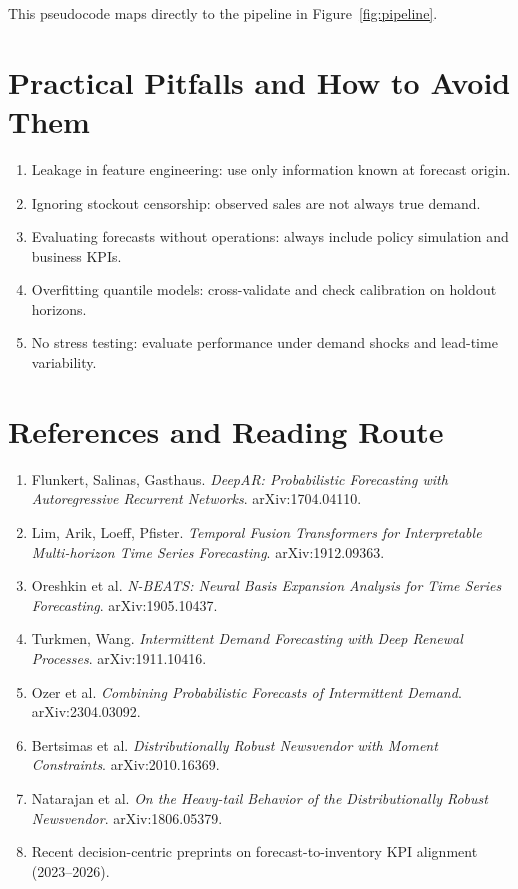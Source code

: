 \documentclass[11pt,a4paper]{article}
\begin{document}
This pseudocode maps directly to the pipeline in Figure~\ref{fig:pipeline}.

\section{Practical Pitfalls and How to Avoid Them}

\begin{enumerate}
    \item Leakage in feature engineering: use only information known at forecast origin.
    \item Ignoring stockout censorship: observed sales are not always true demand.
    \item Evaluating forecasts without operations: always include policy simulation and business KPIs.
    \item Overfitting quantile models: cross-validate and check calibration on holdout horizons.
    \item No stress testing: evaluate performance under demand shocks and lead-time variability.
\end{enumerate}

\section{References and Reading Route}

\begin{enumerate}
    \item Flunkert, Salinas, Gasthaus. \textit{DeepAR: Probabilistic Forecasting with Autoregressive Recurrent Networks}. arXiv:1704.04110.
    \item Lim, Arik, Loeff, Pfister. \textit{Temporal Fusion Transformers for Interpretable Multi-horizon Time Series Forecasting}. arXiv:1912.09363.
    \item Oreshkin et al. \textit{N-BEATS: Neural Basis Expansion Analysis for Time Series Forecasting}. arXiv:1905.10437.
    \item Turkmen, Wang. \textit{Intermittent Demand Forecasting with Deep Renewal Processes}. arXiv:1911.10416.
    \item Ozer et al. \textit{Combining Probabilistic Forecasts of Intermittent Demand}. arXiv:2304.03092.
    \item Bertsimas et al. \textit{Distributionally Robust Newsvendor with Moment Constraints}. arXiv:2010.16369.
    \item Natarajan et al. \textit{On the Heavy-tail Behavior of the Distributionally Robust Newsvendor}. arXiv:1806.05379.
    \item Recent decision-centric preprints on forecast-to-inventory KPI alignment (2023--2026).
\end{enumerate}
\end{document}
